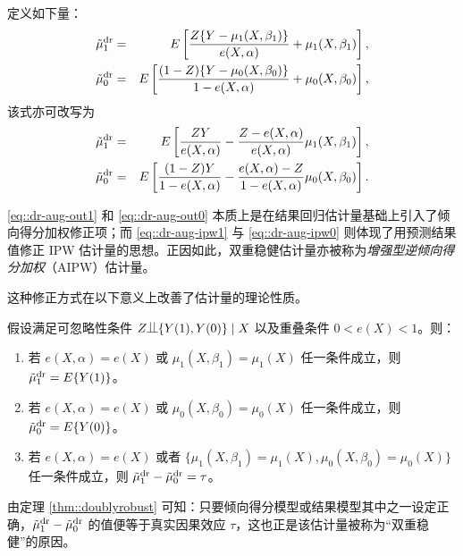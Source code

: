 定义如下量：
\begin{eqnarray}
\tilde{\mu}_1^\textup{dr} &=& E\left[   \frac{Z\{ Y-\mu_1(X,\beta_1) \}}{  e(X,\alpha) }   + \mu_1(X, \beta_1)  \right] , \label{eq::dr-aug-out1}   \\
\tilde{\mu}_0^\textup{dr} &=& E\left[   \frac{(1-Z)\{ Y-\mu_0(X,\beta_0) \}}{  1-e(X,\alpha) }   + \mu_0(X, \beta_0)  \right]  , \label{eq::dr-aug-out0} 
\end{eqnarray}
该式亦可改写为
\begin{eqnarray}
\tilde{\mu}_1^\textup{dr} &=& E\left[   \frac{Z Y}{  e(X,\alpha) }   - \frac{  Z -  e(X,\alpha)  }{ e(X,\alpha) } \mu_1(X, \beta_1)  \right]  ,\label{eq::dr-aug-ipw1} \\
\tilde{\mu}_0^\textup{dr} &=& E\left[   \frac{(1-Z) Y}{  1-e(X,\alpha) }    - \frac{ e(X,\alpha)-Z  }{1- e(X,\alpha)} \mu_0(X, \beta_0)  \right]    .\label{eq::dr-aug-ipw0} 
\end{eqnarray}
 
\eqref{eq::dr-aug-out1} 和 \eqref{eq::dr-aug-out0} 本质上是在结果回归估计量基础上引入了倾向得分加权修正项；而 \eqref{eq::dr-aug-ipw1} 与 \eqref{eq::dr-aug-ipw0} 则体现了用预测结果值修正 IPW 估计量的思想。正因如此，双重稳健估计量亦被称为{\it 增强型逆倾向得分加权}（AIPW）估计量。 



这种修正方式在以下意义上改善了估计量的理论性质。
 
 


\begin{theorem}
\label{thm::doublyrobust}
假设满足可忽略性条件 $Z \ind  \{  Y(1), Y(0) \} \mid X$ 以及重叠条件 $0 < e(X) < 1$。则： 
\begin{enumerate}
\item
若 $e(X,\alpha) = e(X)$ 或 $\mu_1(X, \beta_1) = \mu_1(X)$ 任一条件成立，则 $\tilde{\mu}_1^\textup{dr} = E\{  Y(1) \}$。
\item 
若 $e(X,\alpha) = e(X)$ 或 $\mu_0(X, \beta_0) = \mu_0(X)$ 任一条件成立，则 $\tilde{\mu}_0^\textup{dr} = E\{  Y(0) \}$。
\item 
若 $e(X,\alpha) = e(X)$ 或者 $\{\mu_1(X, \beta_1) = \mu_1(X),   \mu_0(X, \beta_0) = \mu_0(X)\}$ 任一条件成立，则 $\tilde{\mu}_1^\textup{dr} - \tilde{\mu}_0^\textup{dr} = \tau$。 
\end{enumerate}
\end{theorem}


由定理 \ref{thm::doublyrobust} 可知：只要倾向得分模型或结果模型其中之一设定正确，$\tilde{\mu}_1^\textup{dr} - \tilde{\mu}_0^\textup{dr} $ 的值便等于真实因果效应 $\tau$，这也正是该估计量被称为“双重稳健”的原因。  


